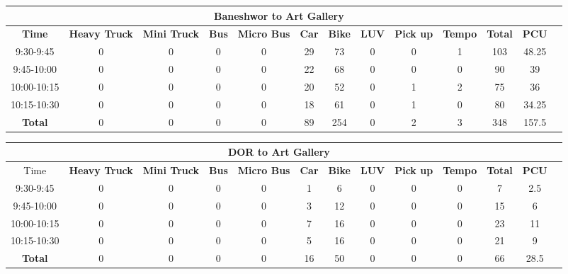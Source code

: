 \begin{landscape}
\centering
\begin{table}[h!]
\centering
\begin{tabular}{|c|c|c|c|c|c|c|c|c|c|c|c|c|}
    \hline
    \multicolumn{12}{|c|}{\textbf{Baneshwor to Art Gallery}} \\
    \hline
    \textbf{Time} & \textbf{Heavy Truck} & \textbf{Mini Truck} & \textbf{Bus} & \textbf{Micro Bus} & \textbf{Car} & \textbf{Bike} & \textbf{LUV} & \textbf{Pick up} & \textbf{Tempo} & \textbf{\textbf{Total}} & \textbf{PCU} \\
    \hline
    9:30-9:45	&0	&0	&0	&0	&29	&73	&0	&0	&1	&103	&48.25 \\ \hline
    9:45-10:00	&0	&0	&0	&0	&22	&68	&0	&0	&0	&90	&39 \\ \hline
    10:00-10:15	&0	&0	&0	&0	&20	&52	&0	&1	&2	&75	&36 \\ \hline
    10:15-10:30	&0	&0	&0	&0	&18	&61	&0	&1	&0	&80	&34.25 \\ \hline
    \textbf{Total}	    &0	&0	&0	&0	&89	&254	&0	&2	&3 &348 &157.5 \\ \hline

\end{tabular}

\vspace{0.5cm}

\begin{tabular}{|c|c|c|c|c|c|c|c|c|c|c|c|c|}
    \hline
    \multicolumn{12}{|c|}{\textbf{DOR to Art Gallery}} \\
    \hline
        Time & \textbf{Heavy Truck} & \textbf{Mini Truck} & \textbf{Bus} & \textbf{Micro Bus} & \textbf{Car} & \textbf{Bike} & \textbf{LUV} & \textbf{Pick up} & \textbf{Tempo} & \textbf{\textbf{Total}} & \textbf{PCU} \\
    \hline
    9:30-9:45	&0	&0	&0	&0	&1	&6	&0	&0	&0	&7	&2.5 \\ \hline
    9:45-10:00	&0	&0	&0	&0	&3	&12	&0	&0	&0	&15	&6 \\ \hline
    10:00-10:15	&0	&0	&0	&0	&7	&16	&0	&0	&0	&23	&11 \\ \hline
    10:15-10:30	&0	&0	&0	&0	&5	&16	&0	&0	&0	&21	&9 \\ \hline
    \textbf{Total}	&0	&0	&0	&0	&16	&50	&0	&0	&0	&66	&28.5 \\ \hline
\end{tabular}

\vspace{0.5cm}


\end{table}
\end{landscape}
